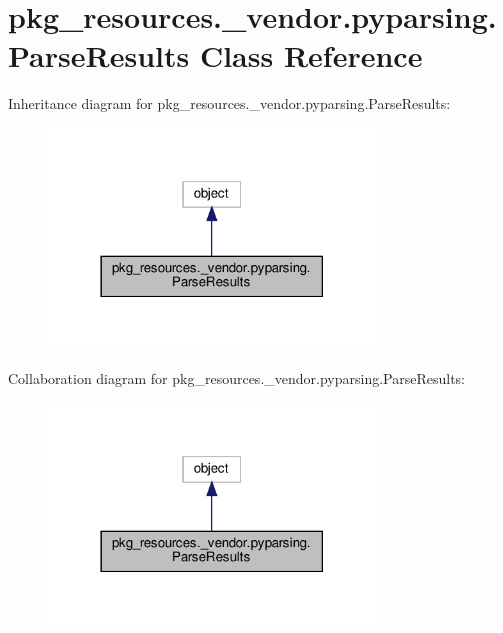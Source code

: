 \hypertarget{classpkg__resources_1_1__vendor_1_1pyparsing_1_1ParseResults}{}\section{pkg\+\_\+resources.\+\_\+vendor.\+pyparsing.\+Parse\+Results Class Reference}
\label{classpkg__resources_1_1__vendor_1_1pyparsing_1_1ParseResults}


Inheritance diagram for pkg\+\_\+resources.\+\_\+vendor.\+pyparsing.\+Parse\+Results\+:
\nopagebreak
\begin{figure}[H]
\begin{center}
\leavevmode
\includegraphics[width=246pt]{classpkg__resources_1_1__vendor_1_1pyparsing_1_1ParseResults__inherit__graph}
\end{center}
\end{figure}


Collaboration diagram for pkg\+\_\+resources.\+\_\+vendor.\+pyparsing.\+Parse\+Results\+:
\nopagebreak
\begin{figure}[H]
\begin{center}
\leavevmode
\includegraphics[width=246pt]{classpkg__resources_1_1__vendor_1_1pyparsing_1_1ParseResults__coll__graph}
\end{center}
\end{figure}
